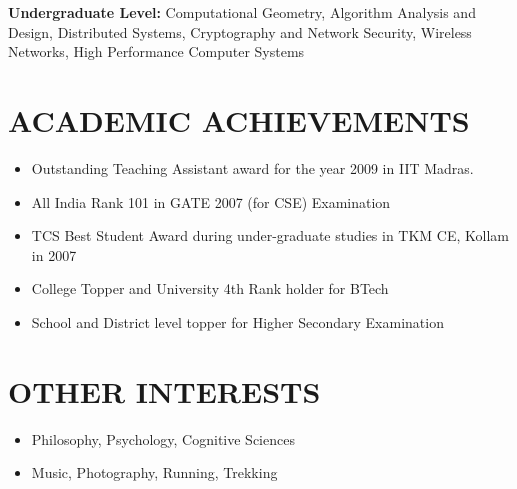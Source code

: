 \documentclass{res}
\begin{document}
\begin{resume}
\textbf{Undergraduate Level:}
Computational Geometry, 
Algorithm Analysis and Design, 
Distributed Systems, 
Cryptography and Network Security, 
Wireless Networks, 
High Performance Computer Systems

\section{ACADEMIC ACHIEVEMENTS}          
\begin{itemize}
\item Outstanding Teaching Assistant award for the year 2009 in IIT Madras.
\item All India Rank 101 in GATE 2007 (for CSE) Examination
\item TCS Best Student Award during under-graduate studies in TKM CE, Kollam in 2007
\item College Topper and University 4th Rank holder for BTech
\item School and District level topper for Higher Secondary Examination

\end{itemize}

\section{OTHER INTERESTS}

\begin{itemize}
\item Philosophy, Psychology, Cognitive Sciences
\item Music, Photography, Running, Trekking 

\end{itemize} 
\end{resume}
\end{document}
